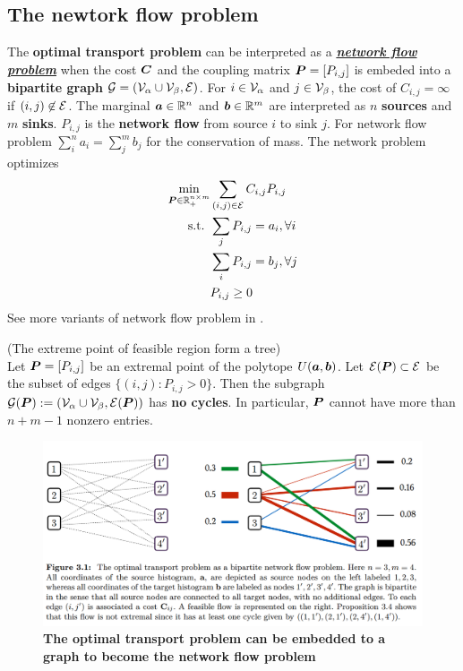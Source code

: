 \documentclass[11pt]{article}
\begin{document}
\subsection{The newtork flow problem}
The \textbf{optimal transport problem} can be interpreted as a \underline{\emph{\textbf{network flow problem}}} when the cost $\boldsymbol{C}$ and the coupling matrix $\boldsymbol{P} = [P_{i,j}]$ is embeded into a \textbf{bipartite graph} ${\mathcal G} = ({\mathcal V}_{\alpha}\cup {\mathcal V}_{\beta}, {\mathcal E})$. For $i\in {\mathcal V}_{\alpha}$ and $j \in {\mathcal V}_{\beta}$, the cost of $C_{i,j} = \infty$ if $(i,j) \not\in {\mathcal E}$.  The marginal $\boldsymbol{a} \in {\mathbb R}^{n}$ and $\boldsymbol{b} \in {\mathbb R}^{m}$ are interpreted as $n$ \textbf{sources} and $m$ \textbf{sinks}. $P_{i,j}$ is the \textbf{network flow} from source $i$ to sink $j$. For network flow problem $\sum_{i}^{n} a_i = \sum_{j}^{m} b_j$ for  the conservation of mass. The network problem optimizes
\begin{align}
\min_{\boldsymbol{P} \in {\mathbb R}_{+}^{n \times m}} & \sum_{(i,j) \in {\mathcal E}}C_{i,j} P_{i,j} \label{eqn: optimal_transport_network_flow}\\
\text{s.t. }&  \sum_{j}P_{i,j} = a_{i}, \forall i \label{eqn: network_flow_source}\\
&\sum_{i}P_{i,j} = b_{j} , \forall j \label{eqn: network_flow_sink} \\
&P_{i,j} \ge 0 \nonumber
\end{align} See more variants of network flow problem in \citep{bertsimas1997introduction}.

\begin{proposition} (The extreme point of feasible region form a tree)\\
Let $\boldsymbol{P} = [P_{i,j}]$ be an extremal point of the polytope $U(\boldsymbol{a}, \boldsymbol{b})$. Let ${\mathcal E}(\boldsymbol{P}) \subset {\mathcal E}$ be the subset of edges $\{(i, j): P_{i,j} > 0 \}$. Then the subgraph ${\mathcal G}(\boldsymbol{P}) := ({\mathcal V}_{\alpha}\cup {\mathcal V}_{\beta}, {\mathcal E}(\boldsymbol{P}))$ has \textbf{no cycles}. In particular, $\boldsymbol{P}$ cannot have more than $n + m - 1$ nonzero entries.
\end{proposition}



\begin{figure}
\begin{minipage}[t]{1\linewidth}
  \centering
  \centerline{\includegraphics[scale = 0.3]{network_flow_problem.png}}
\end{minipage}
\caption{\footnotesize{\textbf{The optimal transport problem can be embedded to a graph to become the network flow problem}}}
\label{fig: network_flow_problem}
\end{figure}
\newpage
\end{document}
